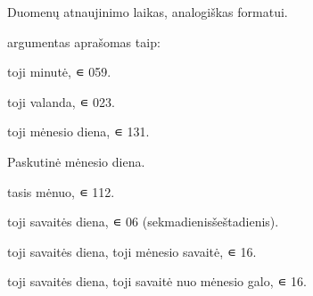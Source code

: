 \documentclass[letterpaper,10pt,lithuanian]{sphinxmanual}
\begin{document}
\begin{fulllineitems}

\pysigstartsignatures
{}
\pysigstopsignatures{}

\begin{fulllineitems}
\label{\detokenize{formules:func.cron}}
\pysigstartsignatures
{}
\pysigstopsignatures
\sphinxAtStartPar
Duomenų atnaujinimo laikas, analogiškas  formatui.

\sphinxAtStartPar
{} argumentas aprašomas taip:
\begin{description}
\sphinxAtStartPar
{}\sphinxhyphen{}toji minutė,  ∊ 0\sphinxhyphen{}59.

\sphinxAtStartPar
{}\sphinxhyphen{}toji valanda,  ∊ 0\sphinxhyphen{}23.

\sphinxAtStartPar
{}\sphinxhyphen{}toji mėnesio diena,  ∊ 1\sphinxhyphen{}31.

\sphinxAtStartPar
Paskutinė mėnesio diena.

\sphinxAtStartPar
{}\sphinxhyphen{}tasis mėnuo,  ∊ 1\sphinxhyphen{}12.

\sphinxAtStartPar
{}\sphinxhyphen{}toji savaitės diena,  ∊ 0\sphinxhyphen{}6 (sekmadienis\sphinxhyphen{}šeštadienis).

\sphinxAtStartPar
{}\sphinxhyphen{}toji savaitės diena, \sphinxhyphen{}toji mėnesio savaitė,  ∊ 1\sphinxhyphen{}6.

\sphinxAtStartPar
{}\sphinxhyphen{}toji savaitės diena, \sphinxhyphen{}toji savaitė nuo mėnesio galo, 
∊ 1\sphinxhyphen{}6.


\end{description}
\end{fulllineitems}
\end{fulllineitems}
\end{document}
